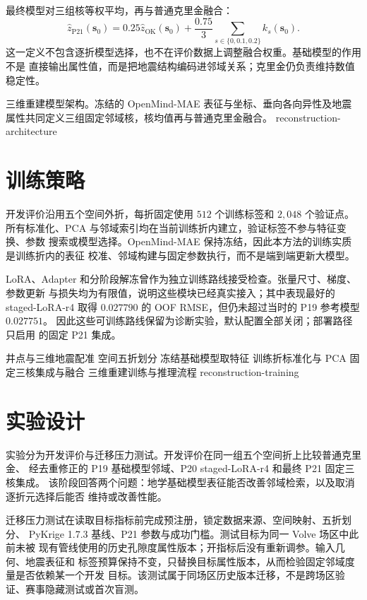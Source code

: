 最终模型对三组核等权平均，再与普通克里金融合：
\begin{equation}
  \hat{z}_{\mathrm{P21}}(\bm{s}_0)
  =0.25\hat{z}_{\mathrm{OK}}(\bm{s}_0)
  +\frac{0.75}{3}\sum_{s\in\{0,0.1,0.2\}}k_s(\bm{s}_0).
  \label{eq:reconstruction-p21}
\end{equation}
这一定义不包含逐折模型选择，也不在评价数据上调整融合权重。基础模型的作用不是
直接输出属性值，而是把地震结构编码进邻域关系；克里金仍负责维持数值稳定性。

  {三维重建模型架构。冻结的 OpenMind-MAE 表征与坐标、垂向各向异性及地震属性共同定义三组固定邻域核，核均值再与普通克里金融合。}
  {reconstruction-architecture}

\section{训练策略}

开发评价沿用五个空间外折，每折固定使用 $512$ 个训练标签和 $2{,}048$ 个验证点。
所有标准化、PCA 与邻域索引均在当前训练折内建立，验证标签不参与特征变换、参数
搜索或模型选择。OpenMind-MAE 保持冻结，因此本方法的训练实质是训练折内的表征
校准、邻域构建与固定参数执行，而不是端到端更新大模型。

LoRA、Adapter 和分阶段解冻曾作为独立训练路线接受检查。张量尺寸、梯度、参数更新
与损失均为有限值，说明这些模块已经真实接入；其中表现最好的 staged-LoRA-r4
取得 $0.027790$ 的 OOF RMSE，但仍未超过当时的 P19 参考模型 $0.027751$。
因此这些可训练路线保留为诊断实验，默认配置全部关闭；部署路径只启用
 的固定 P21 集成。

\TrainingFlow
  {井点与三维地震配准}
  {空间五折划分}
  {冻结基础模型取特征}
  {训练折标准化与 PCA}
  {固定三核集成与融合}
  {三维重建训练与推理流程}
  {reconstruction-training}

\section{实验设计}

实验分为开发评价与迁移压力测试。开发评价在同一组五个空间折上比较普通克里金、
经去重修正的 P19 基础模型邻域、P20 staged-LoRA-r4 和最终 P21 固定三核集成。
该阶段回答两个问题：地学基础模型表征能否改善邻域检索，以及取消逐折元选择后能否
维持或改善性能。

迁移压力测试在读取目标指标前完成预注册，锁定数据来源、空间映射、五折划分、
PyKrige 1.7.3 基线、P21 参数与成功门槛。测试目标为同一 Volve 场区中此前未被
现有管线使用的历史孔隙度属性版本；开指标后没有重新调参。输入几何、地震表征和
标签预算保持不变，只替换目标属性版本，从而检验固定邻域度量是否依赖某一个开发
目标。该测试属于同场区历史版本迁移，不是跨场区验证、赛事隐藏测试或首次盲测。

